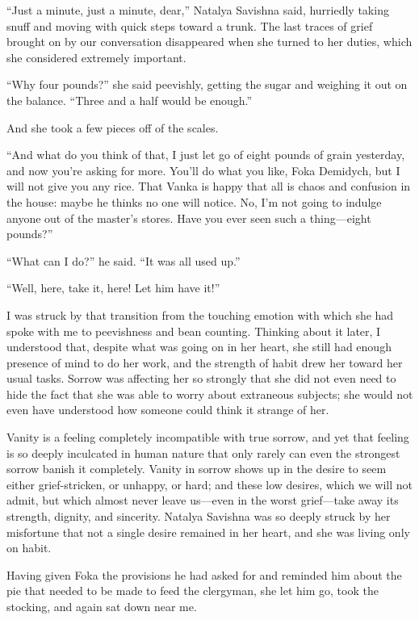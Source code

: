 ``Just a minute, just a minute, dear,'' Natalya Savishna said, hurriedly taking snuff and moving with quick steps toward a trunk. The last traces of grief brought on by our conversation disappeared when she turned to her duties, which she considered extremely important.

``Why four pounds?'' she said peevishly, getting the sugar and weighing it out on the balance. ``Three and a half would be enough.'' %

And she took a few pieces off of the scales.

``And what do you think of that, I just let go of eight pounds of grain yesterday, and now you're asking for more. You'll do what you like, Foka Demidych, but I will not give you any rice. That Vanka is happy that all is chaos and confusion in the house: maybe he thinks no one will notice. No, I'm not going to indulge anyone out of the master's stores. Have you ever seen such a thing---eight pounds?'' %

``What can I do?'' he said. ``It was all used up.'' %

``Well, here, take it, here! Let him have it!'' %

I was struck by that transition from the touching emotion with which she had spoke with me to peevishness and bean counting. Thinking about it later, I understood that, despite what was going on in her heart, she still had enough presence of mind to do her work, and the strength of habit drew her toward her usual tasks. Sorrow was affecting her so strongly that she did not even need to hide the fact that she was able to worry about extraneous subjects; she would not even have understood how someone could think it strange of her.

Vanity is a feeling completely incompatible with true sorrow, and yet that feeling is so deeply inculcated in human nature that only rarely can even the strongest sorrow banish it completely. Vanity in sorrow shows up in the desire to seem either grief-stricken, or unhappy, or hard; and these low desires, which we will not admit, but which almost never leave us---even in the worst grief---take away its strength, dignity, and sincerity. Natalya Savishna was so deeply struck by her misfortune that not a single desire remained in her heart, and she was living only on habit.

Having given Foka the provisions he had asked for and reminded him about the pie that needed to be made to feed the clergyman, she let him go, took the stocking, and again sat down near me.

